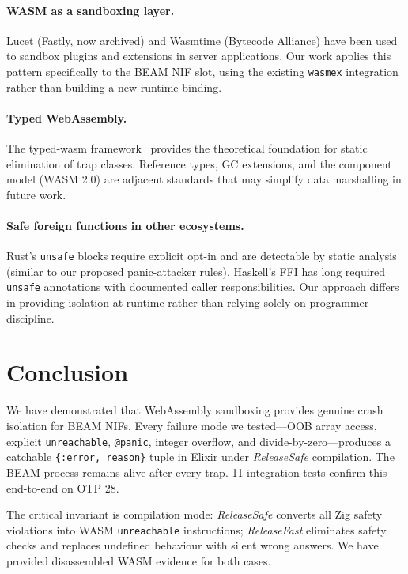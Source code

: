 \documentclass[11pt,a4paper]{article}
\begin{document}
\paragraph{WASM as a sandboxing layer.}
Lucet (Fastly, now archived) and Wasmtime (Bytecode Alliance) have been used
to sandbox plugins and extensions in server applications. Our work applies this
pattern specifically to the BEAM NIF slot, using the existing \texttt{wasmex}
integration rather than building a new runtime binding.

\paragraph{Typed WebAssembly.}
The typed-wasm framework~\cite{jewell2026typedwasm} provides the theoretical
foundation for static elimination of trap classes. Reference types, GC
extensions, and the component model (WASM 2.0) are adjacent standards that
may simplify data marshalling in future work.

\paragraph{Safe foreign functions in other ecosystems.}
Rust's \texttt{unsafe} blocks require explicit opt-in and are detectable by
static analysis (similar to our proposed panic-attacker rules). Haskell's FFI
has long required \texttt{unsafe} annotations with documented caller
responsibilities. Our approach differs in providing isolation at runtime rather
than relying solely on programmer discipline.

\section{Conclusion}

We have demonstrated that WebAssembly sandboxing provides genuine crash
isolation for BEAM NIFs. Every failure mode we tested---OOB array access,
explicit \texttt{unreachable}, \texttt{@panic}, integer overflow, and
divide-by-zero---produces a catchable \texttt{\{:error, reason\}} tuple in
Elixir under \textit{ReleaseSafe} compilation. The BEAM process remains alive
after every trap. 11 integration tests confirm this end-to-end on OTP 28.

The critical invariant is compilation mode: \textit{ReleaseSafe} converts all
Zig safety violations into WASM \texttt{unreachable} instructions;
\textit{ReleaseFast} eliminates safety checks and replaces undefined behaviour
with silent wrong answers. We have provided disassembled WASM evidence for
both cases.
\end{document}
